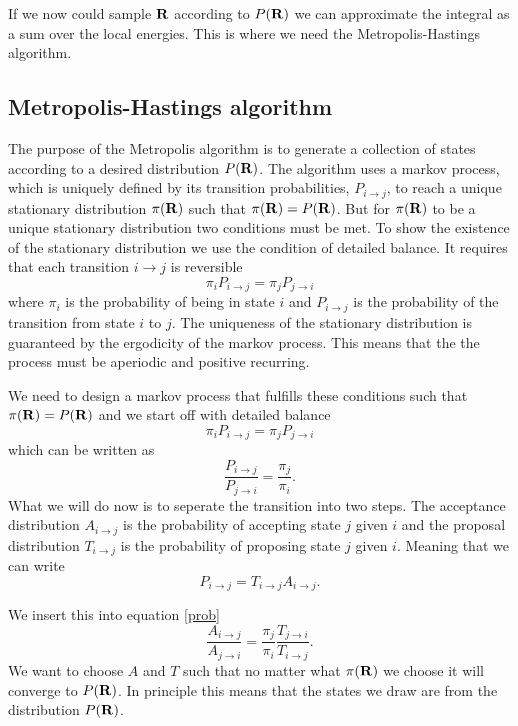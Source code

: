 \documentclass[a4paper,10pt]{article}
\begin{document}
If we now could sample ${\bf R}$ according to $P({\bf R})$ we can approximate the integral as a sum over the local energies. This is where
we need the Metropolis-Hastings algorithm.


\subsection{Metropolis-Hastings algorithm}
The purpose of the Metropolis algorithm is to generate a collection of states according to a desired distribution $P({\bf R})$. The algorithm uses a markov process, which is 
uniquely defined by its transition probabilities, $P_{i \rightarrow j}$, to reach a unique stationary distribution $\pi({\bf R})$ such that  $\pi({\bf R}) = P({\bf R})$. 
But for $\pi({\bf R})$ to be a unique stationary distribution two conditions must be met. To show the existence of the stationary distribution we use the condition of detailed balance. It requires that each transition $i\rightarrow j$ is reversible
\begin{equation}
 \pi_i P_{i\rightarrow j} = \pi_j P_{j\rightarrow i}
\end{equation}
where $\pi_i$ is the probability of being in state $i$ and $P_{i\rightarrow j}$ is the probability of the transition from state $i$ to $j$.
The uniqueness of the stationary distribution is guaranteed by the ergodicity of the markov process. This means that the the process must be aperiodic and positive recurring.

We need to design a markov process that fulfills these conditions such that $\pi({\bf R}) = P({\bf R})$ and we start off with detailed balance
\begin{equation}
 \pi_i P_{i\rightarrow j} = \pi_j P_{j\rightarrow i}
\end{equation}
which can be written as
\begin{equation}\label{prob}
 \frac{P_{i\rightarrow j}}{P_{j\rightarrow i}} = \frac{\pi_j}{\pi_i}.
\end{equation}
What we will do now is to seperate the transition into two steps. The acceptance distribution $A_{i\rightarrow j}$ is the probability of accepting state $j$ given $i$
and the proposal distribution $T_{i\rightarrow j}$ is the probability of proposing state $j$ given $i$. Meaning that we can write
\begin{equation}
 P_{i\rightarrow j} = T_{i\rightarrow j} A_{i\rightarrow j}.
\end{equation}

We insert this into equation \ref{prob}
\begin{equation}
 \frac{A_{i\rightarrow j}}{A_{j\rightarrow i}} = \frac{\pi_j}{\pi_i}\frac{T_{j\rightarrow i}}{T_{i\rightarrow j}}.
\end{equation}
We want to choose $A$ and $T$ such that no matter what $\pi({\bf R})$ we choose it will converge to $P({\bf R})$. 
In principle this means that the states we draw are from the distribution $P({\bf R})$.
\end{document}
